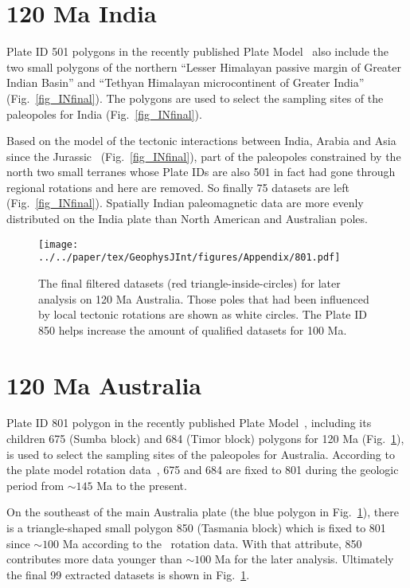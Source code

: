 \section{120 Ma India}

Plate ID 501 polygons in the recently published Plate Model~\citep{Y18} also
include the two small polygons of the northern ``Lesser Himalayan passive
margin of Greater Indian Basin'' and ``Tethyan Himalayan microcontinent of
Greater India'' (Fig.~\ref{fig_INfinal}). The polygons are used to select the
sampling sites of the paleopoles for India (Fig.~\ref{fig_INfinal}).

Based on the model of the tectonic interactions between India, Arabia and Asia
since the Jurassic~\citep{G15} (Fig.~\ref{fig_INfinal}), part of the paleopoles
constrained by the north two small terranes whose Plate IDs are also 501 in fact
had gone through regional rotations and here are removed. So finally 75 datasets
are left (Fig.~\ref{fig_INfinal}). Spatially Indian paleomagnetic data are more
evenly distributed on the India plate than North American and Australian poles.

\begin{figure}[!ht]
\texttt{[image: ../../paper/tex/GeophysJInt/figures/Appendix/801.pdf]}
\caption[Final filtered datasets for analysis on 120 Ma
Australia]{The final filtered datasets (red triangle-inside-circles) for later
analysis on 120 Ma Australia. Those poles that had been influenced
by local tectonic rotations are shown as white circles. The Plate ID 850 helps
increase the amount of qualified datasets for 100
Ma.}\label{fig_AUfinal}
\end{figure}

\section{120 Ma Australia}

Plate ID 801 polygon in the recently published Plate Model~\citep{Y18}, including
its children 675 (Sumba block) and 684 (Timor block) polygons for
120 Ma (Fig.~\ref{fig_AUfinal}), is used to select the sampling
sites of the paleopoles for Australia. According to the plate model rotation
data~\citep{Y18}, 675 and 684 are fixed to 801 during the geologic period from
${\sim}145$ Ma to the present.

On the southeast of the main Australia plate (the blue polygon in
Fig.~\ref{fig_AUfinal}), there is a triangle-shaped small polygon 850
(Tasmania block) which is fixed to 801 since ${\sim}100$ Ma according to
the~\citet{Y18} rotation data. With that attribute, 850 contributes more data
younger than ${\sim}100$ Ma for the later analysis. Ultimately the final 99 extracted
datasets is shown in Fig.~\ref{fig_AUfinal}.

